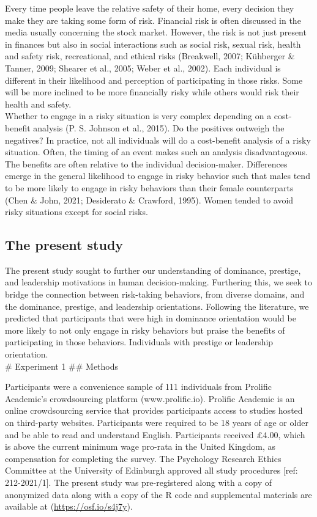 \documentclass[
  donotrepeattitle,doc, 12pt, a4paper,floatsintext]{apa7}
\begin{document}
Every time people leave the relative safety of their home, every decision they make they are taking some form of risk. Financial risk is often discussed in the media usually concerning the stock market. However, the risk is not just present in finances but also in social interactions such as social risk, sexual risk, health and safety risk, recreational, and ethical risks (Breakwell, 2007; Kühberger \& Tanner, 2009; Shearer et al., 2005; Weber et al., 2002). Each individual is different in their likelihood and perception of participating in those risks. Some will be more inclined to be more financially risky while others would risk their health and safety.\\

Whether to engage in a risky situation is very complex depending on a cost-benefit analysis (P. S. Johnson et al., 2015). Do the positives outweigh the negatives? In practice, not all individuals will do a cost-benefit analysis of a risky situation. Often, the timing of an event makes such an analysis disadvantageous. The benefits are often relative to the individual decision-maker. Differences emerge in the general likelihood to engage in risky behavior such that males tend to be more likely to engage in risky behaviors than their female counterparts (Chen \& John, 2021; Desiderato \& Crawford, 1995). Women tended to avoid risky situations except for social risks.

\hypertarget{the-present-study}{%
\subsection{The present study}\label{the-present-study}}

The present study sought to further our understanding of dominance, prestige, and leadership motivations in human decision-making. Furthering this, we seek to bridge the connection between risk-taking behaviors, from diverse domains, and the dominance, prestige, and leadership orientations. Following the literature, we predicted that participants that were high in dominance orientation would be more likely to not only engage in risky behaviors but praise the benefits of participating in those behaviors. Individuals with prestige or leadership orientation.\\
\# Experiment 1
\#\# Methods

Participants were a convenience sample of 111 individuals from Prolific Academic's crowdsourcing platform (www.prolific.io). Prolific Academic is an online crowdsourcing service that provides participants access to studies hosted on third-party websites. Participants were required to be 18 years of age or older and be able to read and understand English. Participants received £4.00, which is above the current minimum wage pro-rata in the United Kingdom, as compensation for completing the survey. The Psychology Research Ethics Committee at the University of Edinburgh approved all study procedures {[}ref: 212-2021/1{]}. The present study was pre-registered along with a copy of anonymized data along with a copy of the R code and supplemental materials are available at (\url{https://osf.io/s4j7y}).
\end{document}
